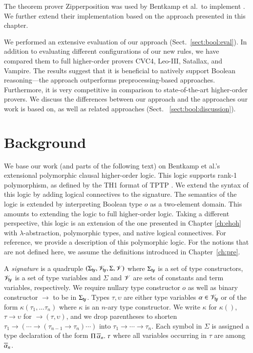 The theorem prover Zipperposition \cite{sc-15-simon-phd,sc-supind-17} was used
by Bentkamp et al.\ to implement \lsup{}. We further extend their implementation
based on the approach presented in this chapter.

We performed an extensive evaluation of our approach (Sect.~\ref{sect:bool:eval}).
In addition to evaluating different configurations of our new rules, we have
compared them to full higher-order provers CVC4, Leo-III,  Satallax, and Vampire.
The results suggest that it is beneficial to natively support Boolean reasoning---the approach outperforms preprocessing-based approaches. Furthermore, it is
very competitive in comparison to state-of-the-art higher-order provers. We discuss the differences between our approach and the
approaches our work is based on, as well as related approaches (Sect.~
\ref{sect:bool:discussion}).


\section{Background} 
\label{sect:bool:background}

We base our work (and parts of the following text) on Bentkamp et al.'s
\cite{bbtvw-21-sup-lam} extensional polymorphic clausal higher-order logic. This
logic supports rank-1 polymorphism, as defined by the TH1 format of TPTP
\cite{ksr-16-th1}.
We
extend the syntax of this logic by adding logical connectives to the signature.
The semantics of the logic is extended by interpreting Boolean type $o$ as a
two-element domain. This amounts to extending the logic to full higher-order
logic. Taking a different perspective, this logic is an extension of the one
presented in Chapter \ref{ch:ehoh} with $\lambda$-abstraction, polymorphic
types, and native logical connectives. For reference, we provide a
description of this polymorphic logic. For the notions that are not defined here,
we assume the definitions introduced in Chapter~\ref{ch:pre}.

A {\em signature} is a quadruple $(\Sigma_\mathsf{ty}, \mathscr{V}_\mathsf{ty}, \Sigma, \mathscr{V})$ where $\Sigma_\mathsf{ty}$ is a
set of type constructors, $\mathscr{V}_\mathsf{ty}$ is a set of type variables and $\Sigma$ and
$\mathscr{V}$ are sets of constants and term variables, respectively. We require nullary
type constructor $o$ as well as binary constructor $\rightarrow$
to be in $\Sigma_\mathsf{ty}$. Types $\tau, \upsilon$ are either type variables $\alpha \in
\mathscr{V}_\mathsf{ty}$ or of the form $\kappa(\tau_1, \ldots \tau_n)$ where $\kappa$ is an
$n$-ary type constructor. We write $\kappa$ for $\kappa()$, $\tau \rightarrow
\upsilon$ for $\rightarrow(\tau, \upsilon)$, and we drop parentheses to shorten 
$\tau_1 \rightarrow (\cdots \rightarrow (\tau_{n-1} \rightarrow \tau_n) \cdots)$ into $\tau_1 \rightarrow \cdots \rightarrow
\tau_n$. Each symbol in $\Sigma$ is
assigned a type declaration of the form $\Pi\,\overline{\alpha}_{n}.\; \tau$ where all variables
occurring in $\tau$ are among $\overline{\alpha}_{n}$.

